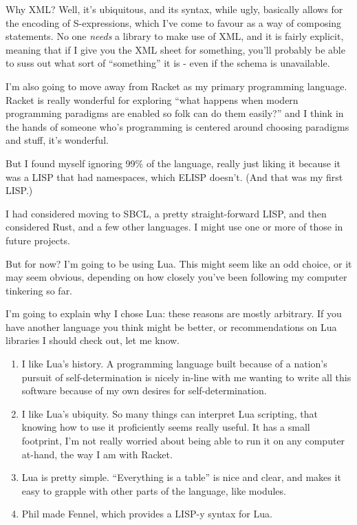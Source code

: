 \documentclass[11pt]{article}
\begin{document}
\begin{itemize}
Why XML? Well, it’s ubiquitous, and its syntax, while ugly, basically allows for the encoding of S-expressions, which I’ve come to favour as a way of composing statements. No one \emph{needs} a library to make use of XML, and it is fairly explicit, meaning that if I give you the XML sheet for something, you’ll probably be able to suss out what sort of “something” it is - even if the schema is unavailable.

I’m also going to move away from Racket as my primary programming language. Racket is really wonderful for exploring “what happens when modern programming paradigms are enabled so folk can do them easily?” and I think in the hands of someone who’s programming is centered around choosing paradigms and stuff, it’s wonderful.

But I found myself ignoring 99\% of the language, really just liking it because it was a LISP that had namespaces, which ELISP doesn’t. (And that was my first LISP.)

I had considered moving to SBCL, a pretty straight-forward LISP, and then considered Rust, and a few other languages. I might use one or more of those in future projects.

But for now? I’m going to be using Lua. This might seem like an odd choice, or it may seem obvious, depending on how closely you’ve been following my computer tinkering so far.

I’m going to explain why I chose Lua: these reasons are mostly arbitrary. If you have another language you think might be better, or recommendations on Lua libraries I should check out, let me know.

\begin{enumerate}
\item I like Lua’s history. A programming language built because of a nation’s pursuit of self-determination is nicely in-line with me wanting to write all this software because of my own desires for self-determination.
\item I like Lua’s ubiquity. So many things can interpret Lua scripting, that knowing how to use it proficiently seems really useful. It has a small footprint, I’m not really worried about being able to run it on any computer at-hand, the way I am with Racket.
\item Lua is pretty simple. “Everything is a table” is nice and clear, and makes it easy to grapple with other parts of the language, like modules.
\item Phil made Fennel, which provides a LISP-y syntax for Lua.
\end{enumerate}


\end{itemize}
\end{document}
